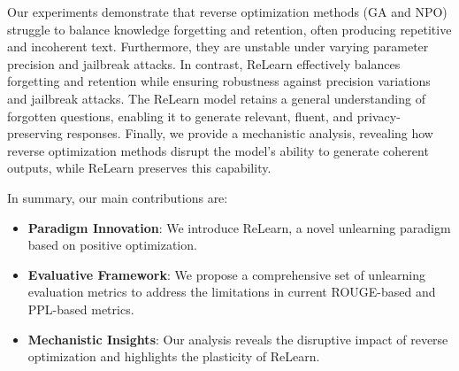 Our experiments demonstrate that reverse optimization methods (GA and NPO) struggle to balance knowledge forgetting and retention, often producing repetitive and incoherent text. 
Furthermore, they are unstable under varying parameter precision and jailbreak attacks.
In contrast, ReLearn effectively balances forgetting and retention while ensuring robustness against precision variations and jailbreak attacks. 
The ReLearn model retains a general understanding of forgotten questions, enabling it to generate relevant, fluent, and privacy-preserving responses.
Finally, we provide a mechanistic analysis, revealing how reverse optimization methods disrupt the model’s ability to generate coherent outputs, while ReLearn preserves this capability. 

In summary, our main contributions are:
\begin{itemize}
    \vspace{-1.3ex}
    \item \textbf{Paradigm Innovation}: We introduce ReLearn, a novel unlearning paradigm based on positive optimization.
    \vspace{-2ex}
    \item \textbf{Evaluative Framework}: 
    We propose a comprehensive set of unlearning evaluation metrics to address the limitations in current ROUGE-based and PPL-based metrics. 
    \vspace{-2ex}
    \item \textbf{Mechanistic Insights}: Our analysis reveals the disruptive impact of reverse optimization and highlights the plasticity of ReLearn. 
\end{itemize}
